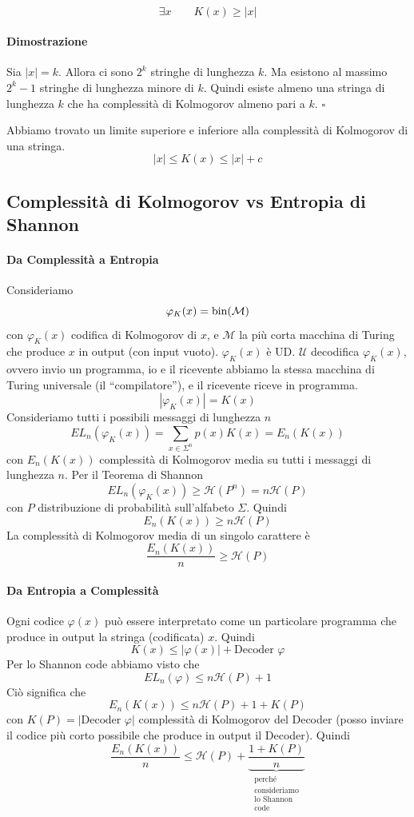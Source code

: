 \begin{theorem}~
    $$
        \exists x \qquad K(x) \geq |x|
    $$
\end{theorem}
\paragraph{Dimostrazione} Sia $|x|=k$. Allora ci sono $2^k$ stringhe di lunghezza $k$. Ma esistono al massimo $2^k-1$ stringhe di lunghezza minore di $k$. Quindi esiste almeno una stringa di lunghezza $k$ che ha complessità di Kolmogorov almeno pari a $k$. \hfill $\square$\bigskip

Abbiamo trovato un limite superiore e inferiore alla complessità di Kolmogorov di una stringa. 
$$
    |x| \leq K(x) \leq |x| + c
$$

\subsection{Complessità di Kolmogorov vs Entropia di Shannon} 
\paragraph{Da Complessità a Entropia} Consideriamo 
$$
    \varphi_K(x) = \operatorname*{bin}(\mathcal{M})
$$
con $\varphi_K(x)$ codifica di Kolmogorov di $x$, e $\mathcal{M}$ la più corta macchina di Turing che produce $x$ in output (con input vuoto). $\varphi_K(x)$ è UD. $\mathcal{U}$ decodifica $\varphi_K(x)$, ovvero invio un programma, io e il ricevente abbiamo la stessa macchina di Turing universale (il ``compilatore''), e il ricevente riceve in programma.
$$
    |\varphi_K(x)| = K(x)
$$
Consideriamo tutti i possibili messaggi di lunghezza $n$
$$
    EL_n(\varphi_K(x)) = \sum_{x\in\Sigma^n} p(x)K(x) = E_n(K(x))
$$
con $E_n(K(x))$ complessità di Kolmogorov media su tutti i messaggi di lunghezza $n$. Per il Teorema di Shannon
$$
    EL_n(\varphi_K(x)) \geq \mathcal{H}(P^n) = n\mathcal{H}(P)
$$
con $P$ distribuzione di probabilità sull'alfabeto $\Sigma$. Quindi
$$
    E_n(K(x)) \geq n\mathcal{H}(P)
$$
La complessità di Kolmogorov media di un singolo carattere è 
$$
    \frac{E_n(K(x))}{n} \geq \mathcal{H}(P)
$$

\paragraph{Da Entropia a Complessità} Ogni codice $\varphi(x)$ può essere interpretato come un particolare programma che produce in output la stringa (codificata) $x$. Quindi 
$$
    K(x) \leq |\varphi(x)| + \text{Decoder }\varphi
$$
Per lo Shannon code abbiamo visto che
$$
    EL_n(\varphi) \leq n\mathcal{H}(P) + 1
$$
Ciò significa che 
$$
    E_n(K(x)) \leq n\mathcal{H}(P) + 1 + K(P)
$$
con $K(P)=|\text{Decoder }\varphi|$ complessità di Kolmogorov del Decoder (posso inviare il codice più corto possibile che produce in output il Decoder). Quindi
$$
    \frac{E_n(K(x))}{n} \leq \mathcal{H}(P) + \underbrace{\frac{1+K(P)}{n}}_{\substack{\text{perché}\\\text{consideriamo}\\\text{lo Shannon}\\\text{code}}}
$$
